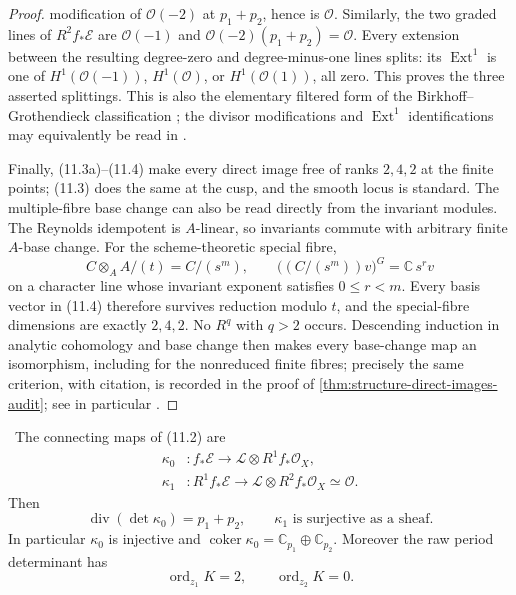 \begin{proof}
modification of $\mathcal O(-2)$ at $p_1+p_2$, hence is $\mathcal O$.
Similarly, the two graded lines of $R^2f_*\mathcal E$ are
$\mathcal O(-1)$ and
$\mathcal O(-2)(p_1+p_2)=\mathcal O$.  Every extension between the resulting
degree-zero and degree-minus-one lines splits: its $\operatorname{Ext}^1$
is one of $H^1(\mathcal O(-1))$, $H^1(\mathcal O)$, or
$H^1(\mathcal O(1))$, all zero.  This proves the three asserted splittings.
This is also the elementary filtered form of the
Birkhoff--Grothendieck classification
\cite[Theorem~2.1, p.~126]{Grothendieck1957}; the divisor modifications and
$\operatorname{Ext}^1$ identifications may equivalently be read in
\cite[Tags 0C6K, 0B3A, and 01XT]{StacksProject}.

Finally, (11.3a)--(11.4) make every direct image free of ranks $2,4,2$ at
the finite points; (11.3) does the same at the cusp, and the smooth locus is
standard.  The multiple-fibre base change can also be read directly from the
invariant modules.  The Reynolds idempotent is $A$-linear, so invariants
commute with arbitrary finite $A$-base change.  For the scheme-theoretic
special fibre,
\[
 C\otimes_AA/(t)=C/(s^m),
 \qquad
 \bigl((C/(s^m))v\bigr)^G=\mathbb C\,s^rv
\]
on a character line whose invariant exponent satisfies $0\le r<m$.
Every basis vector in (11.4) therefore survives reduction modulo $t$, and
the special-fibre dimensions are exactly $2,4,2$.  No $R^q$ with $q>2$
occurs.  Descending induction in analytic cohomology and base change then
makes every base-change map an isomorphism, including for the nonreduced
finite fibres; precisely the same criterion, with citation, is recorded in
the proof of
\cref{thm:structure-direct-images-audit}; see in particular
\cite[Chapter~III, \S3, Theorem~3.4 and Corollary~3.10]{BanicaStanasila1976}.
\end{proof}

\begin{proposition}
\label{prop:log-ks-divisor}
\Verified\ The connecting maps of (11.2) are
\begin{align*}
 \kappa_0&:f_*\mathcal E\longrightarrow
  \mathcal L\otimes R^1f_*\mathcal O_X,\\
 \kappa_1&:R^1f_*\mathcal E\longrightarrow
  \mathcal L\otimes R^2f_*\mathcal O_X\simeq\mathcal O.
\end{align*}
Then
\[
 \operatorname{div}(\det\kappa_0)=p_1+p_2,
 \qquad \kappa_1\text{ is surjective as a sheaf}.
\tag{11.6}
\]
In particular $\kappa_0$ is injective and
$\operatorname{coker}\kappa_0=\mathbb C_{p_1}\oplus\mathbb C_{p_2}$.
Moreover the raw period determinant has
\[
 \operatorname{ord}_{z_1}K=2,\qquad
 \operatorname{ord}_{z_2}K=0.
\tag{11.7}
\]
\end{proposition}

